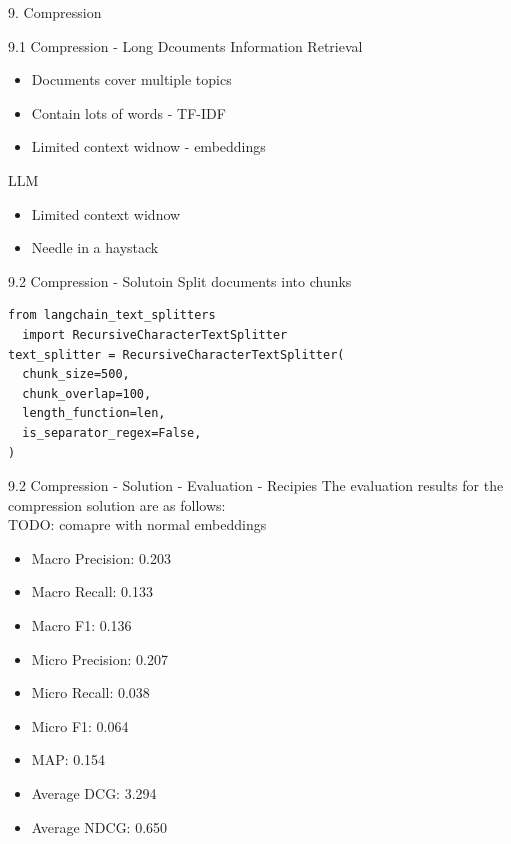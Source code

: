 \documentclass{beamer}
\begin{document}
\begin{frame}{9. Compression}
\end{frame}

\begin{frame}{9.1 Compression - Long Dcouments}
  Information Retrieval
  \begin{itemize}
    \item Documents cover multiple topics
    \item Contain lots of words - TF-IDF
    \item Limited context widnow - embeddings
  \end{itemize}
  LLM
  \begin{itemize}
    \item Limited context widnow
    \item Needle in a haystack
  \end{itemize}
\end{frame}

\begin{frame}[fragile]{9.2 Compression - Solutoin}
  Split documents into chunks
  \begin{verbatim}
from langchain_text_splitters
  import RecursiveCharacterTextSplitter
text_splitter = RecursiveCharacterTextSplitter(
  chunk_size=500,
  chunk_overlap=100,
  length_function=len,
  is_separator_regex=False,
)
\end{verbatim}
\end{frame}

\begin{frame}{9.2 Compression - Solution - Evaluation - Recipies}
  The evaluation results for the compression solution are as follows:
  \\ TODO: comapre with normal embeddings
  \begin{itemize}
    \item Macro Precision: 0.203
    \item Macro Recall: 0.133
    \item Macro F1: 0.136
    \item Micro Precision: 0.207
    \item Micro Recall: 0.038
    \item Micro F1: 0.064
    \item MAP: 0.154
    \item Average DCG: 3.294
    \item Average NDCG: 0.650
  \end{itemize}
\end{frame}
\end{document}
